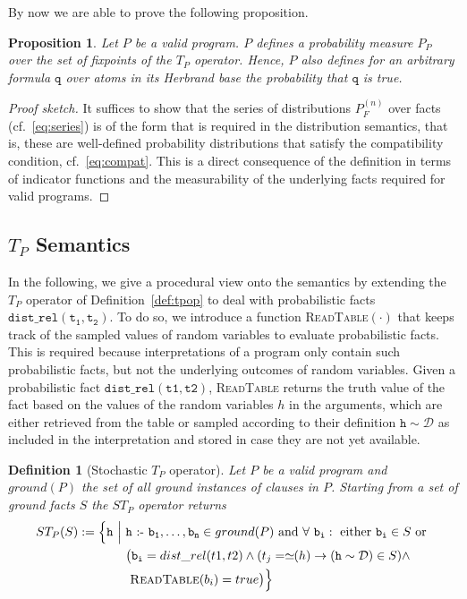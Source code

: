 \documentclass{tlp}
\newtheorem{definition}{Definition}
\newtheorem{proposition}{Proposition}
\newcommand{\coloneq}{\mbox{ :- }}
\newcommand{\val}{\simeq\!\!}
\begin{document}
By now we are able to prove the following proposition.

\begin{proposition}
  \label{prop:adm}
  Let $P$ be a valid program.  $P$ defines a probability measure $P_P$
  over the set of fixpoints of the $T_P$ operator.  Hence, $P$ also
  defines for an arbitrary formula $\mathtt{q}$ over atoms in its
  Herbrand base the probability that $\mathtt{q}$ is true.
\end{proposition}

\begin{proof}[Proof sketch] 
  It suffices to show that the series of distributions $P_F^{(n)}$
  over facts (cf.~\eqref{eq:series}) is of the form that is
  required in the distribution semantics, that is, these are
  well-defined probability distributions that satisfy the
  compatibility condition, cf.~\eqref{eq:compat}. This is a direct
  consequence of the definition in terms of indicator functions and
  the measurability of the underlying facts required for valid
  programs.
\end{proof}


\subsection{$T_P$ Semantics}
\label{sec:tp}

In the following, we give a procedural view onto the semantics by
extending the $T_P$ operator of Definition~\ref{def:tpop} to deal with
probabilistic facts $\mathtt{dist\_rel(t_1,t_2)}$. To do so, we
introduce a function \textsc{ReadTable}$(\cdot)$ that keeps track of
the sampled values of random variables to evaluate probabilistic
facts. This is required because interpretations of a program only
contain such probabilistic facts, but not the underlying outcomes of
random variables. Given a probabilistic fact
$\mathtt{dist\_rel(t1,t2)}$, \textsc{ReadTable} returns the truth
value of the fact based on the values of the random variables $h$ in
the arguments, which are either retrieved from the table or sampled
according to their definition $\mathtt{h}\sim \mathcal{D}$ as included
in the interpretation and stored in case they are not yet available.

\begin{definition}[Stochastic $T_P$ operator]
  \label{def:stp}
  Let $P$ be a valid program and $ground(P)$ the set of all ground
  instances of clauses in $P$.  Starting from a set of ground facts
  $S$ the $ST_P$ operator returns
  \begin{align*}
    ST_P(S) := \Big\{ \mathtt{h}\ \Big|\ &
       \mathtt{h \coloneq b_1,\ldots,b_n} \in ground(P) \mbox{ and }
       \forall\ \mathtt{b_i}: \mbox{ either } \mathtt{b_i}\in S \mbox{
         or }\\
       & \big(\mathtt{b_i}=dist\_rel(t1,t2) \wedge
       (t_j=\val(h)\rightarrow (\mathtt{h}\sim\mathcal{D})\in S) \wedge\\
    & \ \mbox{\textsc{ReadTable}}(b_i)=true  \big) \Big\}
\end{align*}
\end{definition}
\end{document}
